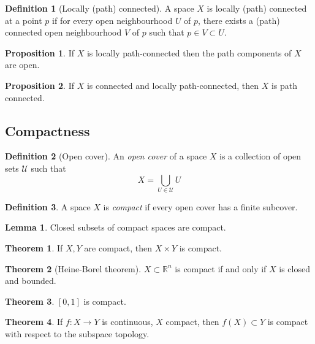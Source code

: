 \documentclass[a4paper,14pt]{extarticle}
\theoremstyle{definition}
\newtheorem*{theorem}{Theorem}
\newtheorem*{definition}{Definition}
\newtheorem*{lemma}{Lemma}
\newtheorem*{proposition}{Proposition}
\begin{document}
\begin{definition}[Locally (path) connected]
  A space $X$ is locally (path) connected at a point $p$ if for every open neighbourhood $U$ of $p$, 
  there exists a (path) connected open neighbourhood $V$ of $p$ such that $p\in V\subset U$.
\end{definition}

\begin{proposition}
  If $X$ is locally path-connected then the path components of $X$ are open.  
\end{proposition}

\begin{proposition}
  If $X$ is connected and locally path-connected, then $X$ is path connected.
\end{proposition}


\subsection{Compactness}
\begin{definition}[Open cover]
  An \emph{open cover} of a space $X$ is a collection of open sets $\mathcal{U}$ such that
  \[X=\bigcup_{U\in\mathcal{U}}U\]
\end{definition}

\begin{definition}
  A space $X$ is \emph{compact} if every open cover has a finite subcover.
\end{definition}

\begin{lemma}
  Closed subsets of compact spaces are compact.
\end{lemma}

\begin{theorem}
  If $X,Y$ are compact, then $X\times Y$ is compact.
\end{theorem}

\begin{theorem}[Heine-Borel theorem]
  $X\subset\mathbb{R}^n$ is compact if and only if $X$ is closed and bounded.
\end{theorem}

\begin{theorem}
  $[0,1]$ is compact.
\end{theorem}

\begin{theorem}
  If $f:X\rightarrow Y$ is continuous, $X$ compact, then $f(X)\subset Y$ is compact with respect to the subspace topology.
\end{theorem}
\end{document}

